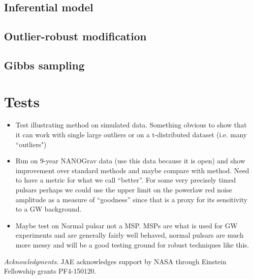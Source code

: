 \documentclass[iop,apj]{emulateapj}
\begin{document}
\subsection{Inferential model}

\subsection{Outlier-robust modification}

\subsection{Gibbs sampling}

\section{Tests}
\begin{itemize}
\item Test illustrating method on simulated data. Something obvious to show that it can work with single large outliers or on a t-distributed dataset (i.e. many ``outliers")
\item Run on 9-year NANOGrav data (use this data because it is open) and show improvement over standard methods and maybe compare with \cite{vvh17} method. Need to have a metric for what we call ``better''. For some very precisely timed pulsars perhaps we could use the upper limit on the powerlaw red noise amplitude as a measure of ``goodness'' since that is a proxy for its sensitivity to a GW background.
\item Maybe test on Normal pulsar not a MSP. MSPs are what is used for GW experiments and are generally fairly well behaved, normal pulsars are much more messy and will be a good testing ground for robust techniques like this.
\end{itemize}

\acknowledgements

\emph{Acknowledgments.}
JAE acknowledges support by NASA through Einstein Fellowship grants PF4-150120.



\end{document}
